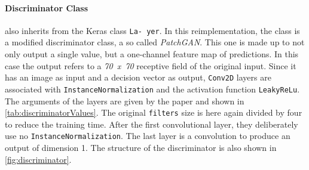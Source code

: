 \documentclass[fleqn,10pt]{SelfArx} %
\begin{document}
\paragraph{Discriminator Class} also inherits from the Keras class \texttt{La- yer}. In this reimplementation, the class is a modified discriminator class, a so called \textit{Patch\ac{GAN}}. This one is made up to not only output a single value, but a one-channel feature map of predictions. In this case the output refers to a \textit{70~x~70} receptive field of the original input. Since it has an image as input and a decision vector as output, \texttt{Conv2D} layers are associated with \texttt{InstanceNormalization} and the activation function \texttt{LeakyReLu}. The arguments of the layers are given by the paper and shown in \autoref{tab:discriminatorValues}. The original \texttt{filters} size is here again divided by four to reduce the training time. After the first convolutional layer, they deliberately use no \texttt{InstanceNormalization}. The last layer is a convolution to produce an output of dimension 1. The structure of the discriminator is also shown in \autoref{fig:discriminator}. \cite{Introduction-to-Cycle-GANs}
\end{document}
